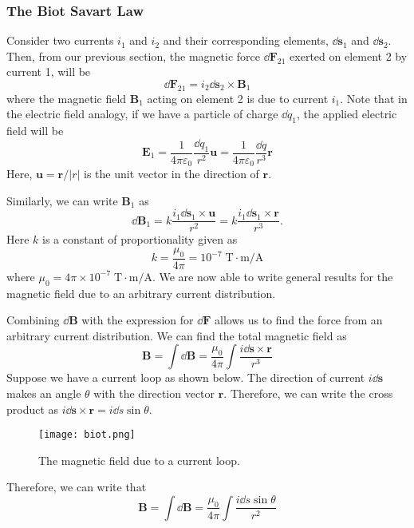 \documentclass[12pt]{article}
\let\vec\mathbf
\begin{document}
\subsubsection{The Biot Savart Law}
Consider two currents $i_1$ and $i_2$ and their corresponding elements, $\dd \vec s_1$ and $\dd \vec s_2$. Then, from our previous section, the magnetic force $\dd \vec F_{21}$ exerted on element 2 by current 1, will be
\[\dd \vec F_{21} = i_2 \dd \vec s_2 \times \vec B_1\]
where the magnetic field $\vec B_1$ acting on element 2 is due to current $i_1$. Note that in the electric field analogy, if we have a particle of charge $\dd q_1$, the applied electric field will be
\[\vec E_1 = \frac{1}{4\pi \varepsilon_0} \frac{\dd q_1}{r^2} \vec u = \frac{1}{4\pi \varepsilon_0} \frac{\dd q}{r^3} \vec r\]
Here, $\vec u = \vec r/|r|$ is the unit vector in the direction of $\vec r$.
\begin{idea}
Similarly, we can write $\vec B_1$ as 
\[\dd \vec B_1 = k \frac{i_1 \dd \vec s_1 \times \vec u}{r^2} = k \frac{i_1 \dd \vec s_1 \times \vec r}{r^3}.\]
Here $k$ is a constant of proportionality given as 
\[k = \frac{\mu_0}{4\pi} = 10^{-7}\;\mathrm{T \cdot m/A}\]
where $\mu_0 = 4\pi \times 10^{-7}\;\mathrm{T \cdot m/A}$. We are now able to write general results for the magnetic field due to an arbitrary current distribution.
\end{idea}
Combining $\dd \vec B$ with the expression for $\dd \vec F$ allows us to find the force from an arbitrary current distribution. We can find the total magnetic field as 
\[\vec B = \int \dd \vec B = \frac{\mu_0}{4\pi}\int \frac{i \dd \vec s \times \vec r}{r^3}\]
Suppose we have a current loop as shown below. The direction of current $i \dd \vec s$ makes an angle $\theta$ with the direction vector $\vec r$. Therefore, we can write the cross product as $i \dd \vec s \times \vec r = i \dd s \sin\theta$. 
  \begin{figure}[H]
  \centering
      \texttt{[image: biot.png]}
      \caption{The magnetic field due to a current loop.}
  \end{figure}
Therefore, we can write that 
\[\vec B = \int \dd \vec B = \frac{\mu_0}{4\pi} \int \frac{i \dd s \sin\theta}{r^2}\]
\end{document}
